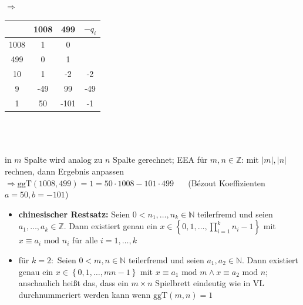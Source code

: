 \documentclass[10pt,a4paper]{article}
\begin{document}
\hspace{0.1cm} $\Rightarrow$\hspace{0.2cm}
\begin{tabular}{ c | c c | c }
   & 1008 & 499 & $-q_{i}$ \\ 
 \hline
 1008 & 1 & 0 & \\  
 499 & 0 & 1 &  \\  
 10 & 1 & -2 & -2\\
 9 & -49 & 99 & -49  \\
 1 & 50 & -101 & -1 \\
\end{tabular} \\\\\\
in $m$ Spalte wird analog zu $n$ Spalte gerechnet; EEA für $m,n\in\mathbb{Z}$: mit $\vert m\vert,\vert n\vert $ rechnen, dann Ergebnis anpassen\\
$\Rightarrow \text{ggT}(1008,499)=1=50\cdot 1008 -101\cdot 499\;\;\;\;\;$ (Bézout Koeffizienten $a=50, b=-101$)
\begin{itemize}
\item \textbf{chinesischer Restsatz:} Seien $0<n_{1},\dotsc ,n_{k}\in \mathbb{N}$ teilerfremd und seien $a_{1},\dotsc ,a_{k} \in \mathbb{Z}$. Dann existiert genau ein $x\in \left\lbrace 0,1,\dotsc,\prod_{i=1}^{k} n_{i}-1\right\rbrace$ mit $x\equiv a_{i} \text{ mod } n_{i}$ für alle $i=1,\dotsc, k$
\item für $k=2:$ Seien $0<m,n\in \mathbb{N}$ teilerfremd und seien $a_{1},a_{2} \in \mathbb{N}$. Dann existiert genau ein $x\in \left\lbrace 0,1,\dotsc,mn-1\right\rbrace$ mit $x\equiv a_{1} \text{ mod } m \land x\equiv a_{2} \text{ mod } n;\;$ anschaulich heißt das, dass ein $m\times n$ Spielbrett eindeutig wie in VL durchnummeriert werden kann wenn $\text{ggT}(m,n)=1$


\end{itemize}
\end{document}
